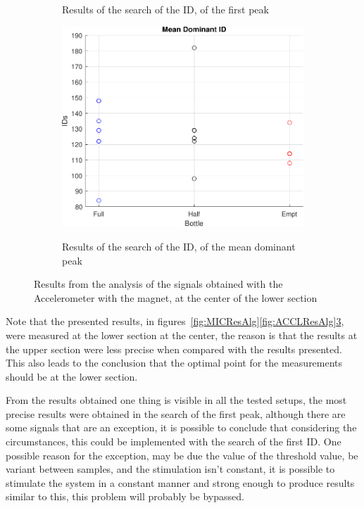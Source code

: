 \begin{figure}[]
\begin{subfigure}{0.45\textwidth}
        \caption{Results of the search of the ID, of the first peak}{}
        \label{subfig:fIDACCI}
    \end{subfigure}
    \begin{subfigure}{0.45\textwidth}
        \centering
        \includegraphics[width=\linewidth]{Chapters/6CHP/Figures/ResultsuCGraphs/Sen/BotMidAcImMa18_05mID.pdf}
        \caption{Results of the search of the ID, of the mean dominant peak}{}
        \label{subfig:mIDACCI}
    \end{subfigure}
    \caption{Results from the analysis of the signals obtained with the Accelerometer with the magnet, at the center of the lower section}{}
    \label{fig:ACCIResAlg}
\end{figure}
Note that the presented results, in figures~\ref{fig:MICResAlg}\ref{fig:ACCLResAlg}\ref{fig:ACCIResAlg}, were measured at the lower section at the center, the reason is that the results at the upper section were less precise when compared with the results presented. This also leads to the conclusion that the optimal point for the measurements should be at the lower section. 

From the results obtained one thing is visible in all the tested setups, the most precise results were obtained in the search of the first peak, although there are some signals that are an exception, it is possible to conclude that considering the circumstances, this could be implemented with the search of the first ID. One possible reason for the exception, may be due the value of the threshold value, be variant between samples, and the stimulation isn't constant, it is possible to stimulate the system in a constant manner and strong enough to produce results similar to this, this problem will probably be bypassed. 

